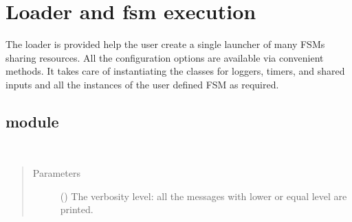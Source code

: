 \documentclass[letterpaper,10pt,english]{sphinxmanual}
\begin{document}
\section{Loader and fsm execution}
\label{\detokenize{loader:loader-and-fsm-execution}}\label{\detokenize{loader:loader}}\label{\detokenize{loader::doc}}
The loader is provided help the user create a single launcher of many FSMs
sharing resources. All the configuration options are available via convenient
methods. It takes care of instantiating the classes for loggers, timers, and
shared inputs and all the instances of the user defined FSM as required.


\subsection{ module}
\label{\detokenize{loader:module-loader}}\label{\detokenize{loader:loader-module}}

\begin{fulllineitems}
\label{\detokenize{loader:loader.loader.setVerbosity}}~\begin{quote}\begin{description}
\item[{Parameters}] \leavevmode
{} () \textendash{} The verbosity level: all the messages with lower or equal level are printed.

\end{description}\end{quote}

\end{fulllineitems}

\end{document}

